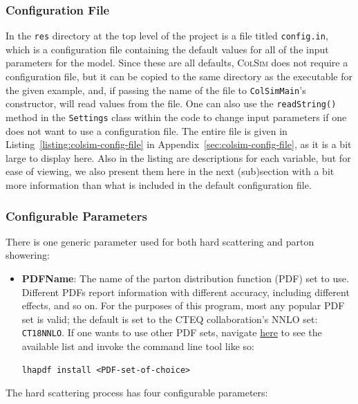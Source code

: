 \subsubsection{Configuration File}

In the \texttt{res} directory at the top level of the project is a file titled \texttt{config.in}, which is a configuration file containing the default values for all of the input parameters for the model. Since these are all defaults, \textsc{ColSim} does not require a configuration file, but it can be copied to the same directory as the executable for the given example, and, if passing the name of the file to \texttt{ColSimMain}'s constructor, will read values from the file. One can also use the \texttt{readString()} method in the \texttt{Settings} class within the code to change input parameters if one does not want to use a configuration file. The entire file is given in Listing~\ref{listing:colsim-config-file} in Appendix~\ref{sec:colsim-config-file}, as it is a bit large to display here. Also in the listing are descriptions for each variable, but for ease of viewing, we also present them here in the next (sub)section with a bit more information than what is included in the default configuration file.



\subsubsection{Configurable Parameters}

There is one generic parameter used for both hard scattering and parton showering:

\begin{itemize}
\item \textbf{PDFName}: The name of the parton distribution function (PDF) set to use. Different PDFs report information with different accuracy, including different effects, and so on. For the purposes of this program, most any popular PDF set is valid; the default is set to the CTEQ collaboration's NNLO set: \texttt{CT18NNLO}. If one wants to use other PDF sets, navigate \href{https://lhapdf.hepforge.org/pdfsets.html}{here} to see the available list and invoke the command line tool like so:
\begin{verbatim}
lhapdf install <PDF-set-of-choice>
\end{verbatim}
\end{itemize}

The hard scattering process has four configurable parameters:

